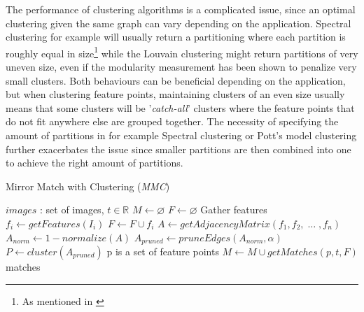\documentclass{article}
\begin{document}
The performance of clustering algorithms is a complicated issue, since 
an optimal clustering given the same graph can vary depending on the 
application. Spectral clustering for example will usually return a 
partitioning where each partition is roughly equal in size\footnote{As 
mentioned in \cite{von2007}} while the Louvain 
clustering\cite{blondel2008} might return partitions of very uneven 
size, even if the modularity measurement has been shown to penalize very 
small clusters\cite{brandes2007}. Both behaviours can be beneficial 
depending on the application, but when clustering feature points, 
maintaining clusters of an even size usually means that some clusters 
will be '\emph{catch-all}' clusters where the feature points that do 
not fit anywhere else are grouped together. The necessity of specifying 
the amount of partitions in for example Spectral clustering or Pott's 
model clustering further exacerbates the issue since smaller partitions 
are then combined into one to achieve the right amount of partitions.

%
\begin{algorithm}
\caption{Mirror Match with Clustering (\emph{MMC})}
\label{alg-mmc}
\begin{algorithmic}
\Require $images$ : set of images, $t \in \mathbb{R}$
\State $M\gets \varnothing$
\State $F\gets \varnothing$
 \Comment Gather features
	\State $f_i\gets getFeatures(I_i)$
	\State $F\gets F \cup f_i$
\EndFor
\State $A\gets getAdjacencyMatrix(f_1, f_2,\; \ldots \;, f_n)$
\State $A_{norm}\gets 1 - normalize(A)$
\State $A_{pruned}\gets pruneEdges(A_{norm},\alpha)$
\State $P\gets cluster(A_{pruned})$
 \Comment p is a set of feature points
	\State $M\gets M \cup getMatches(p, t, F)$
\EndFor \\
\Return matches
\end{algorithmic}
\end{algorithm}
\end{document}
